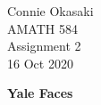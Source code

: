 \documentclass[letter, 12pt]{article}
\begin{document}
\parindent=0in
\newenvironment{problem}[1][]
   {\begin{framed} \textbf{Problem \theprobnum: #1}}
   {\end{framed}\stepcounter{probnum}}
\newenvironment{bookproblem}[1]
   {\begin{framed} \textbf{Problem #1:}}
   {\end{framed}\stepcounter{probnum}}

\begin{flushright}
Connie Okasaki \\
AMATH 584\\
Assignment 2\\
16 Oct 2020
\end{flushright}

\textbf{Yale Faces}
\end{document}
